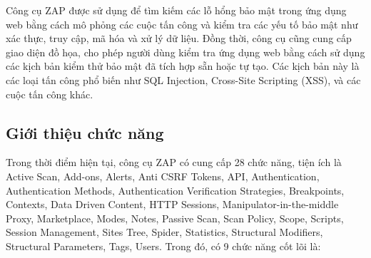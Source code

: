 Công cụ ZAP được sử dụng để tìm kiếm các lỗ hổng bảo mật trong ứng dụng web bằng cách mô phỏng các cuộc tấn công và kiểm tra các yếu tố bảo mật như xác thực, truy cập, mã hóa và xử lý dữ liệu.
Đồng thời, công cụ cũng cung cấp giao diện đồ họa, cho phép người dùng kiểm tra ứng dụng web bằng cách sử dụng các kịch bản kiểm thử bảo mật đã tích hợp sẵn hoặc tự tạo.
Các kịch bản này là các loại tấn công phổ biến như SQL Injection, Cross-Site Scripting (XSS), và các cuộc tấn công khác.

\subsection{Giới thiệu chức năng} \label{subsec:IntroFunc}

\tab Trong thời điểm hiện tại, công cụ ZAP có cung cấp 28 chức năng, tiện ích là Active Scan, Add-ons, Alerts, Anti CSRF Tokens, API, Authentication, Authentication Methods, Authentication Verification Strategies, Breakpoints, Contexts, Data Driven Content, HTTP Sessions, Manipulator-in-the-middle Proxy, Marketplace, Modes, Notes, Passive Scan, Scan Policy, Scope, Scripts, Session Management, Sites Tree, Spider, Statistics, Structural Modifiers, Structural Parameters, Tags, Users.
Trong đó, có 9 chức năng cốt lõi là:

